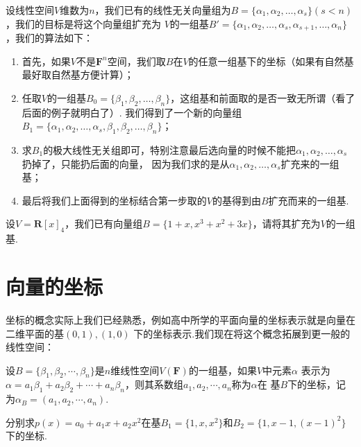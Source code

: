 设线性空间$V$维数为$n$，我们已有的线性无关向量组为$B=\{\alpha_1,\alpha_2,\ldots,\alpha_s\}(s<n)$，我们的目标是将这个向量组扩充为
$V$的一组基$B'=\{\alpha_1,\alpha_2,\ldots,\alpha_s,\alpha_{s+1},\ldots,\alpha_n\}$，我们的算法如下：
\begin{enumerate}
    \item 首先，如果$V$不是$\mathbf{F}^n$空间，我们取$B$在$V$的任意一组基下的坐标（如果有自然基最好取自然基方便计算）；
    \item 任取$V$的一组基$B_0=\{\beta_1,\beta_2,\ldots,\beta_n\}$，这组基和前面取的是否一致无所谓（看了后面的例子就明白了）.
    我们得到了一个新的向量组$B_1=\{\alpha_1,\alpha_2,\ldots,\alpha_s,\beta_1,\beta_2,\ldots,\beta_n\}$；
    \item 求$B_1$的极大线性无关组即可，特别注意最后选向量的时候不能把$\alpha_1,\alpha_2,\ldots,\alpha_s$扔掉了，只能扔后面的向量，
    因为我们求的是从$\alpha_1,\alpha_2,\ldots,\alpha_s$扩充来的一组基；
    \item 最后将我们上面得到的坐标结合第一步取的$V$的基得到由$B$扩充而来的一组基.
\end{enumerate}
\begin{example}
    设$V=\mathbf{R}[x]_4$，我们已有向量组$B=\{1+x,x^3+x^2+3x\}$，请将其扩充为$V$的一组基.
\end{example}
\begin{solution}

\end{solution}

\section{向量的坐标}
坐标的概念实际上我们已经熟悉，例如高中所学的平面向量的坐标表示就是向量在二维平面的基$(0,1),(1,0)$
下的坐标表示.我们现在将这个概念拓展到更一般的线性空间：
\begin{definition}
	设$B=\{\beta_1,\beta_2,\cdots,\beta_n\}$是$n$维线性空间$V(\mathbf{F})$的一组基，如果$V$中元素$\alpha$
	表示为$\alpha=a_1\beta_1+a_2\beta_2+\cdots+a_n\beta_n$，则其系数组$a_1,a_2,\cdots,a_n$称为$\alpha$在
	基$B$下的坐标，记为$\alpha_B=(a_1,a_2,\cdots,a_n)$.
\end{definition}
\begin{example}
	分别求$p(x)=a_0+a_1x+a_2x^2$在基$B_1=\{1,x,x^2\}$和$B_2=\{1,x-1,(x-1)^2\}$下的坐标.
\end{example}

